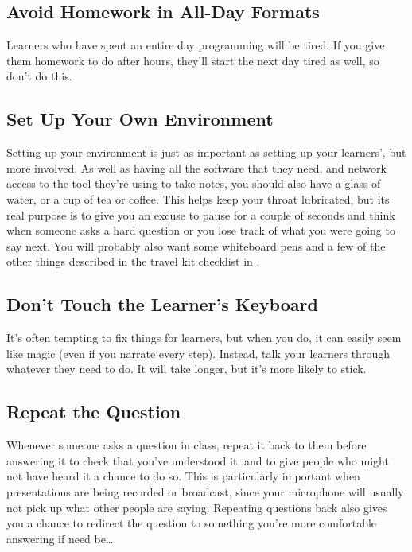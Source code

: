 \subsection*{Avoid Homework in All-Day Formats}

Learners who have spent an entire day programming will be tired.  If
you give them homework to do after hours, they'll start the next day
tired as well, so don't do this.

\subsection*{Set Up Your Own Environment}

Setting up your environment is just as important as setting up your
learners', but more involved. As well as having all the software that
they need, and network access to the tool they're using to take notes,
you should also have a glass of water, or a cup of tea or coffee. This
helps keep your throat lubricated, but its real purpose is to give you
an excuse to pause for a couple of seconds and think when someone asks
a hard question or you lose track of what you were going to say next.
You will probably also want some whiteboard pens and a few of the
other things described in the travel kit checklist in
.

\subsection*{Don't Touch the Learner's Keyboard}

It's often tempting to fix things for learners, but when you do, it
can easily seem like magic (even if you narrate every step). Instead,
talk your learners through whatever they need to do. It will take
longer, but it's more likely to stick.

\subsection*{Repeat the Question}

Whenever someone asks a question in class, repeat it back to them
before answering it to check that you've understood it, and to give
people who might not have heard it a chance to do so. This is
particularly important when presentations are being recorded or
broadcast, since your microphone will usually not pick up what other
people are saying.  Repeating questions back also gives you a chance
to redirect the question to something you're more comfortable
answering if need be{\ldots}

